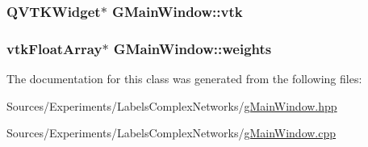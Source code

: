 \hypertarget{class_g_main_window_a0133dd3a1b89e887ede8aec262844914}{
\subsubsection[{vtk}]{\setlength{\rightskip}{0pt plus 5cm}Q\+V\+T\+K\+Widget$\ast$ G\+Main\+Window\+::vtk\hspace{0.3cm}{\ttfamily [private]}}}\label{class_g_main_window_a0133dd3a1b89e887ede8aec262844914}
\hypertarget{class_g_main_window_a90fc9b6fbd1838ac294c5f00894b1bd7}{
\subsubsection[{weights}]{\setlength{\rightskip}{0pt plus 5cm}vtk\+Float\+Array$\ast$ G\+Main\+Window\+::weights\hspace{0.3cm}{\ttfamily [private]}}}\label{class_g_main_window_a90fc9b6fbd1838ac294c5f00894b1bd7}


The documentation for this class was generated from the following files\+:\begin{DoxyCompactItemize}
\item 
Sources/\+Experiments/\+Labels\+Complex\+Networks/\hyperlink{g_main_window_8hpp}{g\+Main\+Window.\+hpp}\item 
Sources/\+Experiments/\+Labels\+Complex\+Networks/\hyperlink{g_main_window_8cpp}{g\+Main\+Window.\+cpp}\end{DoxyCompactItemize}

